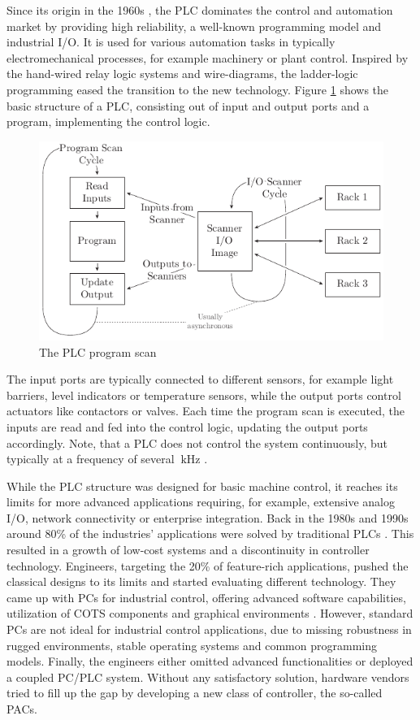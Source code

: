Since its origin in the 1960s \citep{par99}, the \ac{PLC} dominates the
control and automation market by providing high reliability, a well-known
programming model and industrial I/O. It is used for various automation tasks
in typically electromechanical processes, for example machinery or plant
control. Inspired by the hand-wired relay logic systems and wire-diagrams, the
ladder-logic programming eased the transition to the new technology. Figure
\ref{fig:plc} shows the basic structure of a \ac{PLC}, consisting out of input
and output ports and a program, implementing the control logic.
\begin{figure}[tb]
	\centering
	\includegraphics{../figures/plc}
	\caption{The \acs{PLC} program scan \citep[adapted from][]{par99}}
	\label{fig:plc}
\end{figure}
The input ports are typically connected to different sensors, for example
light barriers, level indicators or temperature sensors, while the output
ports control actuators like contactors or valves. Each time the program scan
is executed, the inputs are read and fed into the control logic, updating the
output ports accordingly. Note, that a \ac{PLC} does not control the system
continuously, but typically at a frequency of several $\SI{}{\kilo\hertz}$
\citep{par99}.

While the \ac{PLC} structure was designed for basic machine control, it
reaches its limits for more advanced applications requiring, for example,
extensive analog I/O, network connectivity or enterprise integration. Back in
the 1980s and 1990s around 80\% of the industries' applications were solved by
traditional \acp{PLC} \citep{bel05}. This resulted in a growth of low-cost
systems and a discontinuity in controller technology. Engineers, targeting the
20\% of feature-rich applications, pushed the classical designs to its limits
and started evaluating different technology. They came up with \acp{PC} for
industrial control, offering advanced software capabilities, utilization of
\ac{COTS} components and graphical environments \citep{bel05}. However,
standard \acp{PC} are not ideal for industrial control applications, due to
missing robustness in rugged environments, stable operating systems and common
programming models. Finally, the engineers either omitted advanced
functionalities or deployed a coupled \ac{PC}/\ac{PLC} system. Without any
satisfactory solution, hardware vendors tried to fill up the gap by developing
a new class of controller, the so-called \acp{PAC}.

